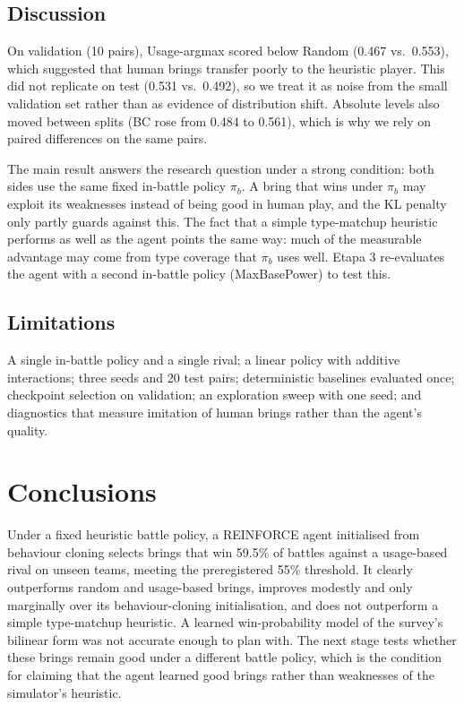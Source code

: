 \subsection{Discussion}
On validation (10 pairs), Usage-argmax scored below Random (0.467 vs.\ 0.553), which suggested that human brings
transfer poorly to the heuristic player. This did not replicate on test (0.531 vs.\ 0.492), so we treat it as noise
from the small validation set rather than as evidence of distribution shift. Absolute levels also moved between
splits (BC rose from 0.484 to 0.561), which is why we rely on paired differences on the same pairs.

The main result answers the research question under a strong condition: both sides use the same fixed in-battle
policy $\pi_b$. A bring that wins under $\pi_b$ may exploit its weaknesses instead of being good in human play, and
the KL penalty only partly guards against this. The fact that a simple type-matchup heuristic performs as well as
the agent points the same way: much of the measurable advantage may come from type coverage that $\pi_b$ uses well.
Etapa 3 re-evaluates the agent with a second in-battle policy (MaxBasePower) to test this.

\subsection{Limitations}
A single in-battle policy and a single rival; a linear policy with additive interactions; three seeds and 20 test
pairs; deterministic baselines evaluated once; checkpoint selection on validation; an exploration sweep with one seed;
and diagnostics that measure imitation of human brings rather than the agent's quality.

\section{Conclusions}
Under a fixed heuristic battle policy, a REINFORCE agent initialised from behaviour cloning selects brings that win
59.5\% of battles against a usage-based rival on unseen teams, meeting the preregistered 55\% threshold.
It clearly outperforms random and usage-based brings, improves modestly and only marginally over its behaviour-cloning
initialisation, and does not outperform a simple type-matchup heuristic. A learned win-probability model of the
survey's bilinear form was not accurate enough to plan with. The next stage tests whether these brings remain good
under a different battle policy, which is the condition for claiming that the agent learned good brings rather than
weaknesses of the simulator's heuristic.
